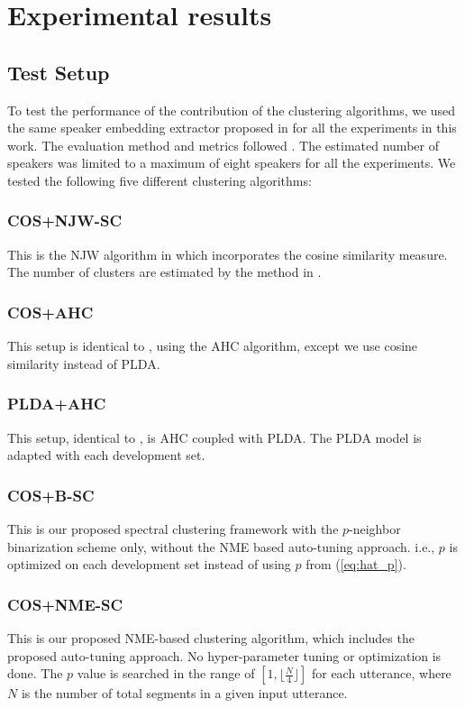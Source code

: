 \documentclass[journal]{IEEEtran}
\begin{document}
\vspace{-0.0ex}
\section{Experimental results}

\subsection{Test Setup}
To test the performance of the contribution of the clustering algorithms, we used the same speaker embedding extractor proposed in \cite{snyder2018x, snyder_git} for all the experiments in this work. The evaluation method and metrics followed \cite{fiscus2006rich}. The estimated number of speakers was limited to a maximum of eight speakers for all the experiments. We tested the following five different clustering algorithms: 
\subsubsection{COS+NJW-SC} This is the NJW algorithm in \cite{ng2002spectral} which incorporates the cosine similarity measure. The number of clusters are estimated by the method in \cite{ning2006spectral}.
\subsubsection{COS+AHC} This setup is identical to \cite{snyder2018x, snyder_git}, using the AHC algorithm, except we use cosine similarity instead of PLDA.
\subsubsection{PLDA+AHC} This setup, identical to \cite{snyder2018x, snyder_git}, is AHC coupled with PLDA.  The PLDA model is adapted with each development set.
\subsubsection{COS+B-SC} This is our proposed spectral clustering framework with the $p$-neighbor binarization scheme only, without the NME based auto-tuning approach. i.e., $p$ is optimized on each development set instead of using $\hat{p}$ from (\ref{eq:hat_p}).
\subsubsection{COS+NME-SC} This is our proposed NME-based clustering algorithm, which includes the proposed auto-tuning approach. No hyper-parameter tuning or optimization is done. The $p$ value is searched in the range of $[1, \lfloor\frac{N}{4}\rfloor]$ for each utterance, where $N$ is the number of total segments in a given input utterance.
\end{document}
